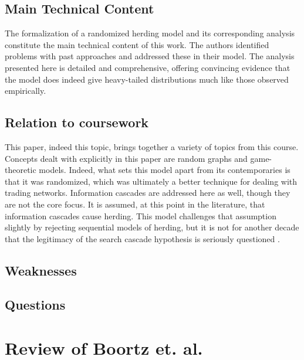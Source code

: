 \documentclass{article}
\begin{document}

\subsection{Main Technical Content}
The formalization of a randomized herding model and its corresponding analysis constitute the main technical content of this work.
The authors identified problems with past approaches and addressed these in their model.
The analysis presented here is detailed and comprehensive, offering convincing evidence that the model does indeed give heavy-tailed distributions much like those observed empirically.

\subsection{Relation to coursework}
This paper, indeed this topic, brings together a variety of topics from this course. 
Concepts dealt with explicitly in this paper are random graphs and game-theoretic models.
Indeed, what sets this model apart from its contemporaries is that it was randomized, which was ultimately a better technique for dealing with trading networks.
Information cascades are addressed here as well, though they are not the core focus.
It is assumed, at this point in the literature, that information cascades cause herding.
This model challenges that assumption slightly by rejecting sequential models of herding, but it is not for another decade that the legitimacy of the search cascade hypothesis is seriously questioned \cite{lin}.

\subsection{Weaknesses}

\subsection{Questions}


\section{Review of Boortz et. al.}
\end{document}

